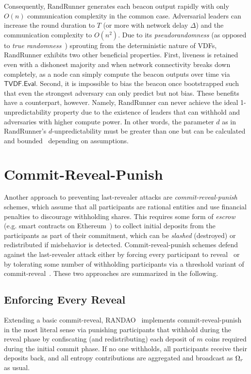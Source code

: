Consequently, RandRunner generates each beacon output rapidly with only $O(n)$ communication complexity in the common case. Adversarial leaders can increase the round duration to $T$ (or more with network delay $\Delta$) and the communication complexity to $O(n^2)$. Due to its \textit{pseudorandomness} (as opposed to \textit{true randomness}~\cite{cascudomt, das2021spurt}) sprouting from the deterministic nature of VDFs, RandRunner exhibits two other beneficial properties. First, liveness is retained even with a dishonest majority and when network connectivity breaks down completely, as a node can simply compute the beacon outputs over time via $\mathsf{TVDF.Eval}$. Second, it is impossible to bias the beacon once bootstrapped such that even the strongest adversary can only predict but not bias. These benefits have a counterpart, however. Namely, RandRunner can never achieve the ideal 1-unpredictability property due to the existence of leaders that can withhold and adversaries with higher compute power. In other words, the parameter $d$ as in RandRunner's $d$-unpredictability must be greater than one but can be calculated and bounded~\cite{schindler2021randrunner} depending on assumptions.

\section{Commit-Reveal-Punish}
\label{section:commit-reveal-punish}
Another approach to preventing last-revealer attacks are \textit{commit-reveal-punish} schemes, which assume that all participants are rational entities and use financial penalties to discourage withholding shares. This requires some form of \textit{escrow} (e.g. smart contracts on Ethereum~\cite{wood2014ethereum}) to collect initial deposits from the participants as part of their commitment, which can be \emph{slashed} (destroyed) or redistributed if misbehavior is detected. Commit-reveal-punish schemes defend against the last-revealer attack either by forcing every participant to reveal~\cite{youcai2017randao, andrychowicz2014secure, bentov2014use} or by tolerating some number of withholding participants via a threshold variant of commit-reveal~\cite{david2020economically}. These two approaches are summarized in the following.

\subsection{Enforcing Every Reveal}
Extending a basic commit-reveal, RANDAO~\cite{youcai2017randao} implements commit-reveal-punish in the most literal sense via punishing participants that withhold during the reveal phase by confiscating (and redistributing) each deposit of $m$ coins required during the initial commit phase. If no one withholds, all participants receive their deposits back, and all entropy contributions are aggregated and broadcast as $\Omega_r$ as usual.

